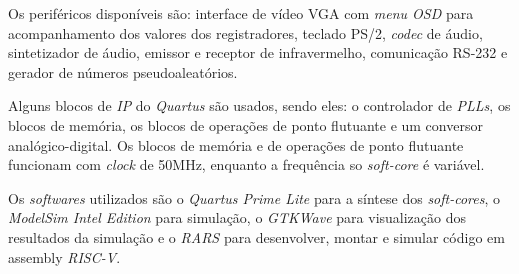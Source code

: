 { Os periféricos disponíveis são: interface de vídeo VGA com \textit{menu OSD}
    para acompanhamento dos valores dos registradores, teclado PS/2, \textit{codec}
    de áudio, sintetizador de áudio, emissor e receptor de infravermelho,
    comunicação RS-232 e gerador de números pseudoaleatórios.
}

{ Alguns blocos de \textit{IP} do \textit{Quartus} são usados, sendo eles: o
    controlador de \textit{PLLs}, os blocos de memória, os blocos de operações
    de ponto flutuante e um conversor analógico-digital. Os blocos de memória e
    de operações de ponto flutuante funcionam com \textit{clock} de 50MHz,
    enquanto a frequência so \textit{soft-core} é variável.
}

{ Os \textit{softwares} utilizados são o \textit{Quartus Prime Lite} para a
    síntese dos \textit{soft-cores}, o \textit{ModelSim Intel Edition} para
    simulação, o \textit{GTKWave} para visualização dos resultados da simulação
    e o \textit{RARS} para desenvolver, montar e simular código em assembly
    \textit{RISC-V}.
}



